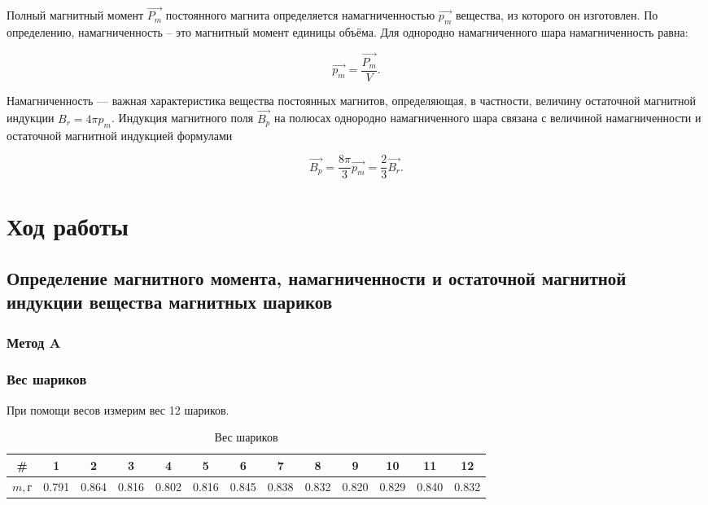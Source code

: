 \documentclass[a4paper, 12pt]{article}
\begin{document}
            Полный магнитный момент $\overrightarrow{P_m}$ постоянного магнита определяется намагниченностью $\overrightarrow{p_m}$ вещества, из которого он изготовлен. По определению, намагниченность – это магнитный момент единицы объёма. Для однородно намагниченного шара намагниченность равна:

            $$
            \overrightarrow{p_m}=\dfrac{\overrightarrow{P_m}}{V}.
            $$

            Намагниченность — важная характеристика вещества постоянных магнитов, определяющая, в частности, величину остаточной магнитной индукции $B_r = 4\pi p_m$. Индукция магнитного поля $\overrightarrow{B_p}$ на полюсах однородно намагниченного шара связана с величиной намагниченности и остаточной магнитной индукцией формулами

            $$
            \overrightarrow{B_p}=\dfrac{8\pi}{3}\overrightarrow{p_m}=\dfrac{2}{3}\overrightarrow{B_r}.
            $$

    \section{Ход работы}

        \subsection{Определение магнитного момента, намагниченности и остаточной магнитной индукции вещества магнитных шариков}
            \subsubsection*{\textbf{Метод A}}
            \subsubsection{Вес шариков}

                При помощи весов измерим вес 12 шариков.

                \begin{table}[!ht]
                    \centering
                    \begin{tabular}{|c|c|c|c|c|c|c|c|c|c|c|c|c|}
                        \hline

                        \# & 1 & 2 & 3 & 4 & 5 & 6 & 7 & 8 & 9 & 10 & 11 & 12\\ \hline
                        $m, г$ & 0.791 & 0.864 & 0.816 & 0.802 & 0.816 & 0.845 & 0.838 & 0.832 & 0.820 & 0.829 & 0.840 & 0.832\\ \hline

                    \end{tabular}
                    \caption{Вес шариков}
                    \label{table:weight}
                \end{table}
\end{document}
